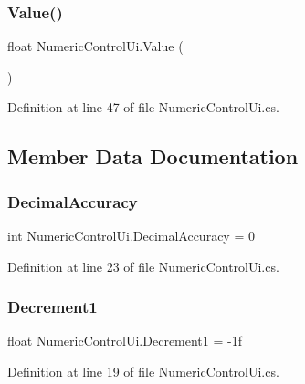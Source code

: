 \mbox{\label{class_numeric_control_ui_a03d4bf8f932d9ef9f7b8dee2626487b0}} 
\subsubsection{\texorpdfstring{Value()}{Value()}}
{\footnotesize\ttfamily float Numeric\+Control\+Ui.\+Value (\begin{DoxyParamCaption}{ }\end{DoxyParamCaption})}



Definition at line 47 of file Numeric\+Control\+Ui.\+cs.



\subsection{Member Data Documentation}
\mbox{\label{class_numeric_control_ui_a653ebdf7d80e0dbc9333d9c075258bdf}} 
\subsubsection{\texorpdfstring{DecimalAccuracy}{DecimalAccuracy}}
{\footnotesize\ttfamily int Numeric\+Control\+Ui.\+Decimal\+Accuracy = 0}



Definition at line 23 of file Numeric\+Control\+Ui.\+cs.

\mbox{\label{class_numeric_control_ui_ab8c218664ec27b8b0623a7d60bb4e2ca}} 
\subsubsection{\texorpdfstring{Decrement1}{Decrement1}}
{\footnotesize\ttfamily float Numeric\+Control\+Ui.\+Decrement1 = -\/1f}



Definition at line 19 of file Numeric\+Control\+Ui.\+cs.

